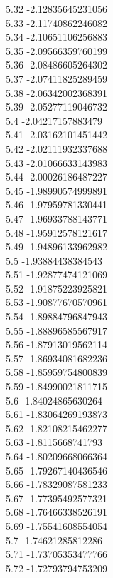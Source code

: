 {5.32	-2.12835645231056\\
5.33	-2.11740862246082\\
5.34	-2.10651106256883\\
5.35	-2.09566359760199\\
5.36	-2.08486605264302\\
5.37	-2.07411825289459\\
5.38	-2.06342002368391\\
5.39	-2.05277119046732\\
5.4	-2.04217157883479\\
5.41	-2.03162101451442\\
5.42	-2.02111932337688\\
5.43	-2.01066633143983\\
5.44	-2.00026186487227\\
5.45	-1.98990574999891\\
5.46	-1.97959781330441\\
5.47	-1.96933788143771\\
5.48	-1.95912578121617\\
5.49	-1.94896133962982\\
5.5	-1.93884438384543\\
5.51	-1.92877474121069\\
5.52	-1.91875223925821\\
5.53	-1.90877670570961\\
5.54	-1.89884796847943\\
5.55	-1.88896585567917\\
5.56	-1.87913019562114\\
5.57	-1.86934081682236\\
5.58	-1.85959754800839\\
5.59	-1.84990021811715\\
5.6	-1.84024865630264\\
5.61	-1.83064269193873\\
5.62	-1.82108215462277\\
5.63	-1.8115668741793\\
5.64	-1.80209668066364\\
5.65	-1.79267140436546\\
5.66	-1.78329087581233\\
5.67	-1.77395492577321\\
5.68	-1.76466338526191\\
5.69	-1.75541608554054\\
5.7	-1.74621285812286\\
5.71	-1.73705353477766\\
5.72	-1.72793794753209\\
}
